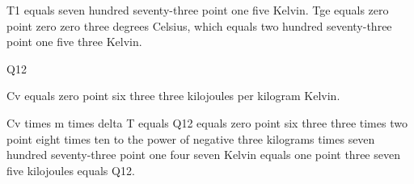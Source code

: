 T1 equals seven hundred seventy-three point one five Kelvin. Tge equals zero point zero zero three degrees Celsius, which equals two hundred seventy-three point one five three Kelvin.

Q12

Cv equals zero point six three three kilojoules per kilogram Kelvin.

Cv times m times delta T equals Q12 equals zero point six three three times two point eight times ten to the power of negative three kilograms times seven hundred seventy-three point one four seven Kelvin equals one point three seven five kilojoules equals Q12.